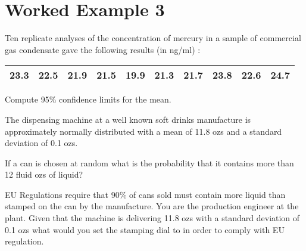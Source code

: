 

\section{Worked Example 3} Ten replicate analyses of the concentration
of mercury in a sample of commercial gas condensate gave the
following results (in ng/ml) :

\begin{tabular}{|c|c|c|c|c|c|c|c|c|c|}
	\hline
	23.3 & 22.5 & 21.9 & 21.5 & 19.9 & 21.3 & 21.7 & 23.8 & 22.6 &
	24.7\\
	\hline
\end{tabular}


Compute 95\% confidence limits for the mean.


 
 \newpage
 
 The dispensing machine at a well known soft drinks manufacture is 
 approximately normally distributed with a mean of 11.8 ozs and a standard 
 deviation of 0.1 ozs.
 
 If a can is chosen at random what is the probability that it contains more than 12 fluid ozs of liquid?
 
 EU Regulations require that 90\% of  cans sold must contain more liquid than stamped on the can by the manufacture.  You are the production engineer at the plant.  Given that the machine is delivering 11.8 ozs with a standard deviation of 0.1 ozs what would you set the stamping dial to in order to comply with EU regulation.
   